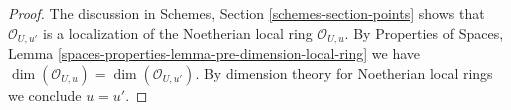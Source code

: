 \documentclass{stacks-project}
\theoremstyle{plain}
\theoremstyle{definition}
\theoremstyle{remark}
\numberwithin{equation}{subsection}
\begin{document}
\begin{proof}
The discussion in Schemes, Section \ref{schemes-section-points}
shows that $\mathcal{O}_{U, u'}$ is a localization of
the Noetherian local ring $\mathcal{O}_{U, u}$.
By Properties of Spaces, Lemma
\ref{spaces-properties-lemma-pre-dimension-local-ring}
we have $\dim(\mathcal{O}_{U, u}) = \dim(\mathcal{O}_{U, u'})$.
By dimension theory for Noetherian local rings we conclude $u = u'$.
\end{proof}
\end{document}
